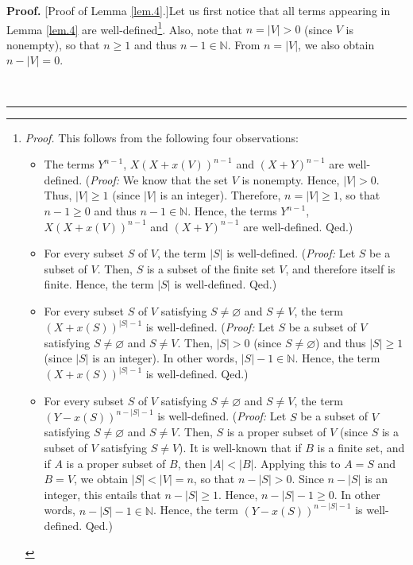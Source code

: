 \documentclass[numbers=enddot,12pt,final,onecolumn,notitlepage]{scrartcl}%
\theoremstyle{definition}
\newenvironment{proof}[1][Proof]{\noindent\textbf{#1.} }{\ \rule{0.5em}{0.5em}}
\newenvironment{verlong}{}{}
\begin{document}
\begin{verlong}
\begin{proof}
[Proof of Lemma \ref{lem.4}.]Let us first notice that all terms appearing in
Lemma \ref{lem.4} are well-defined\footnote{\textit{Proof.} This follows from
the following four observations:
\par
\begin{itemize}
\item The terms $Y^{n-1}$, $X\left(  X+x\left(  V\right)  \right)  ^{n-1}$ and
$\left(  X+Y\right)  ^{n-1}$ are well-defined. (\textit{Proof:} We know that
the set $V$ is nonempty. Hence, $\left\vert V\right\vert >0$. Thus,
$\left\vert V\right\vert \geq1$ (since $\left\vert V\right\vert $ is an
integer). Therefore, $n=\left\vert V\right\vert \geq1$, so that $n-1\geq0$ and
thus $n-1\in\mathbb{N}$. Hence, the terms $Y^{n-1}$, $X\left(  X+x\left(
V\right)  \right)  ^{n-1}$ and $\left(  X+Y\right)  ^{n-1}$ are well-defined.
Qed.)
\par
\item For every subset $S$ of $V$, the term $\left\vert S\right\vert $ is
well-defined. (\textit{Proof:} Let $S$ be a subset of $V$. Then, $S$ is a
subset of the finite set $V$, and therefore itself is finite. Hence, the term
$\left\vert S\right\vert $ is well-defined. Qed.)
\par
\item For every subset $S$ of $V$ satisfying $S\neq\varnothing$ and $S\neq V$,
the term $\left(  X+x\left(  S\right)  \right)  ^{\left\vert S\right\vert -1}$
is well-defined. (\textit{Proof:} Let $S$ be a subset of $V$ satisfying
$S\neq\varnothing$ and $S\neq V$. Then, $\left\vert S\right\vert >0$ (since
$S\neq\varnothing$) and thus $\left\vert S\right\vert \geq1$ (since
$\left\vert S\right\vert $ is an integer). In other words, $\left\vert
S\right\vert -1\in\mathbb{N}$. Hence, the term $\left(  X+x\left(  S\right)
\right)  ^{\left\vert S\right\vert -1}$ is well-defined. Qed.)
\par
\item For every subset $S$ of $V$ satisfying $S\neq\varnothing$ and $S\neq V$,
the term $\left(  Y-x\left(  S\right)  \right)  ^{n-\left\vert S\right\vert
-1}$ is well-defined. (\textit{Proof:} Let $S$ be a subset of $V$ satisfying
$S\neq\varnothing$ and $S\neq V$. Then, $S$ is a proper subset of $V$ (since
$S$ is a subset of $V$ satisfying $S\neq V$). It is well-known that if $B$ is
a finite set, and if $A$ is a proper subset of $B$, then $\left\vert
A\right\vert <\left\vert B\right\vert $. Applying this to $A=S$ and $B=V$, we
obtain $\left\vert S\right\vert <\left\vert V\right\vert =n$, so that
$n-\left\vert S\right\vert >0$. Since $n-\left\vert S\right\vert $ is an
integer, this entails that $n-\left\vert S\right\vert \geq1$. Hence,
$n-\left\vert S\right\vert -1\geq0$. In other words, $n-\left\vert
S\right\vert -1\in\mathbb{N}$. Hence, the term $\left(  Y-x\left(  S\right)
\right)  ^{n-\left\vert S\right\vert -1}$ is well-defined. Qed.)
\end{itemize}
}. Also, note that $n=\left\vert V\right\vert >0$ (since $V$ is nonempty), so
that $n\geq1$ and thus $n-1\in\mathbb{N}$. From $n=\left\vert V\right\vert $,
we also obtain $n-\left\vert V\right\vert =0$.


\end{proof}
\end{verlong}
\end{document}

